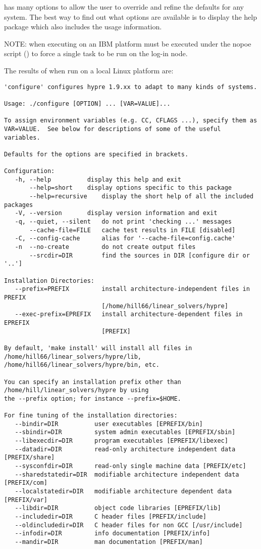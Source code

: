  has many options to allow the user to override and refine the 
defaults for any system. The best way to find out what options are available is
to display the help package which also includes the usage information.

NOTE: when executing on an IBM platform  must be executed under 
the nopoe script () to force a single 
task to be run on the log-in node.

The results of  when run on a local Linux platform are:
\begin{verbatim}
'configure' configures hypre 1.9.xx to adapt to many kinds of systems.

Usage: ./configure [OPTION] ... [VAR=VALUE]...

To assign environment variables (e.g. CC, CFLAGS ...), specify them as
VAR=VALUE.  See below for descriptions of some of the useful variables.

Defaults for the options are specified in brackets.

Configuration:
   -h, --help		   display this help and exit
       --help=short	   display options specific to this package
       --help=recursive	   display the short help of all the included packages
   -V, --version	   display version information and exit
   -q, --quiet, --silent   do not print 'checking ...' messages
       --cache-file=FILE   cache test results in FILE [disabled]
   -C, --config-cache      alias for '--cache-file=config.cache'
   -n  --no-create         do not create output files
       --srcdir=DIR        find the sources in DIR [configure dir or '..']

Installation Directories:
   --prefix=PREFIX         install architecture-independent files in PREFIX
                           [/home/hill66/linear_solvers/hypre]
   --exec-prefix=EPREFIX   install architecture-dependent files in EPREFIX 
                           [PREFIX]

By default, 'make install' will install all files in
/home/hill66/linear_solvers/hypre/lib, /home/hill66/linear_solvers/hypre/bin, etc.

You can specify an installation prefix other than /home/hill/linear_solvers/hypre by using 
the --prefix option; for instance --prefix=$HOME.

For fine tuning of the installation directories:
   --bindir=DIR          user executables [EPREFIX/bin]
   --sbindir=DIR         system admin executables [EPREFIX/sbin]
   --libexecdir=DIR      program executables [EPREFIX/libexec]
   --datadir=DIR         read-only architecture independent data [PREFIX/share]
   --sysconfdir=DIR      read-only single machine data [PREFIX/etc]
   --sharedstatedir=DIR  modifiable architecture independent data [PREFIX/com]
   --localstatedir=DIR   modifiable architecture dependent data [PREFIX/var]
   --libdir=DIR          object code libraries [EPREFIX/lib]
   --includedir=DIR      C header files [PREFIX/include]
   --oldincludedir=DIR   C header files for non GCC [/usr/include]
   --infodir=DIR         info documentation [PREFIX/info]
   --mandir=DIR          man documentation [PREFIX/man]


\end{verbatim}
